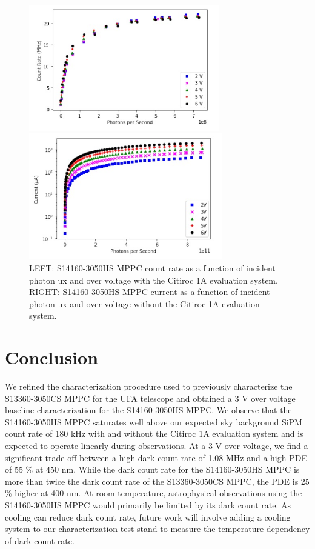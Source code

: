\documentclass{article}
\begin{document}
\begin{figure}[ht]

  \begin{minipage}[b]{0.49\textwidth}
    \centering     
    \includegraphics[height=5.5cm]{images/figura8.jpg}
  \end{minipage}
  \hfill
  \begin{minipage}[b]{0.49\textwidth}
    \centering     
    \includegraphics[height=5.5cm]{images/figura9.jpg}
  \end{minipage}
     
    \caption{LEFT: S14160-3050HS MPPC count rate as a function of incident photon ux and over voltage with the Citiroc 1A evaluation system. RIGHT: S14160-3050HS MPPC current as a function of incident photon ux and over voltage without the Citiroc 1A evaluation system.}
    \label{fig:PhotonsPerSecond}
    
\end{figure}

\section{Conclusion}
We refined the characterization procedure used to previously characterize the S13360-3050CS MPPC for the UFA telescope and obtained a 3 V over voltage baseline characterization for the S14160-3050HS MPPC. We observe that the S14160-3050HS MPPC saturates well above our expected sky background SiPM count rate of 180 kHz with and without the Citiroc 1A evaluation system and is expected to operate linearly during observations. At a 3 V over voltage, we find a significant trade off between a high dark count rate of 1.08 MHz and a high PDE of 55 \% at 450 nm. While the dark count rate for the S14160-3050HS MPPC is more than twice the dark count rate of the S13360-3050CS MPPC, the PDE is 25 \% higher at 400 nm.\cite{li2019characterization} At room temperature, astrophysical observations using the S14160-3050HS MPPC would primarily be limited by its dark count rate. As cooling can reduce dark count rate, future work will involve adding a cooling system to our characterization test stand to measure the temperature dependency of dark count rate.
\end{document}
